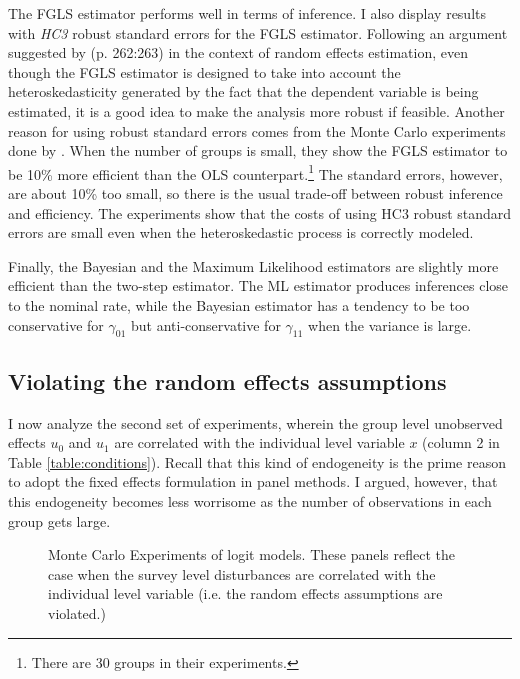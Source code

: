 The FGLS estimator performs well in terms of inference. I also display results with \emph{HC3} robust standard errors for the FGLS estimator. Following an argument suggested by \citet{wooldridge:2001} (p. 262:263) in the context of random effects estimation, even though the FGLS estimator is designed to take into account the heteroskedasticity generated by the fact that the dependent variable is being estimated, it is a good idea to make the analysis more robust if feasible.  Another reason for using robust standard errors comes from the Monte Carlo experiments done by \citet{lewis:2005}.  When the number of groups is small, they show the FGLS estimator to be 10\% more efficient than the OLS counterpart.\footnote{There are 30 groups in their experiments.}  The standard errors, however, are about 10\% too small, so there is the usual trade-off between robust inference and efficiency. The experiments show that the costs of using HC3 robust standard errors are small even when the heteroskedastic process is correctly modeled.

Finally, the Bayesian and the Maximum Likelihood estimators  are slightly more efficient than the two-step estimator. The ML estimator  produces inferences  close to the nominal rate, while the Bayesian estimator has a tendency to be too conservative for $\gamma_{01}$  but anti-conservative for  $\gamma_{11}$ when the variance is large.


\subsection{Violating the random effects assumptions}

I now  analyze the second set of experiments, wherein the group level unobserved effects $u_0$ and $u_1$ are correlated with the individual level variable $x$ (column 2 in Table \ref{table:conditions}). Recall that this kind of endogeneity is the prime reason to adopt the fixed effects formulation in panel methods.  I argued, however, that this endogeneity becomes  less worrisome as the number of observations in each group gets large.


\begin{figure}
  \centering
  \caption{Monte Carlo Experiments of logit models. These panels reflect the case when the survey level disturbances are correlated with the individual level variable (i.e. the random effects assumptions are violated.)}
  \label{fig:violate1}
\end{figure}


